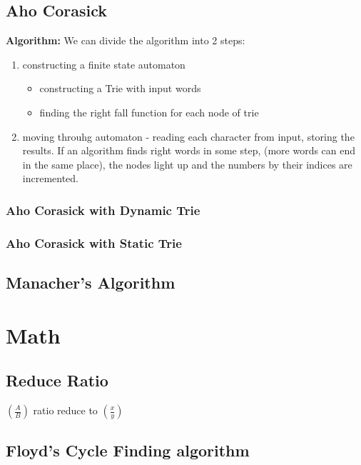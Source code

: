 \documentclass[11pt]{report}
\begin{document}
\section{Aho Corasick}
\textbf{Algorithm:}
We can divide the algorithm into 2 steps:
\begin{enumerate}
	\item constructing a finite state automaton
	\begin{itemize}
		\item constructing a Trie with input words
		\item finding the right fall function for each node of trie
	\end{itemize}
\item moving throuhg automaton - reading each character from input, storing the results.  If an algorithm finds right words in some step, (more words can end in the same place), the nodes light up and the numbers by their indices are incremented.
\end{enumerate}

\subsection{Aho Corasick with Dynamic Trie}

\subsection{Aho Corasick with Static Trie}

\section{Manacher's Algorithm}



\chapter{Math}
\section{Reduce Ratio}
$\left(\frac{A}{B}\right)$ ratio reduce to $\left(\frac{x}{y}\right)$

\section{Floyd's Cycle Finding algorithm}

\end{document}
